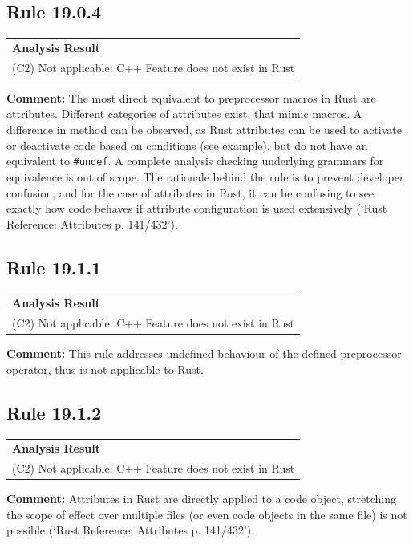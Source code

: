\subsection*{Rule 19.0.4}
\begin{longtable}{p{13cm}}
\textbf{Analysis Result} \\
(C2) Not applicable: C++ Feature does not exist in Rust \\
\end{longtable}
\textbf{Comment:} The most direct equivalent to preprocessor macros in Rust are attributes. Different categories of attributes exist, that mimic \Cpp macros. A difference in method can be observed, as Rust attributes can be used to activate or deactivate code based on conditions (see example), but do not have an equivalent to \texttt{\#undef}. A complete analysis checking underlying grammars for equivalence is out of scope. The rationale behind the rule is to prevent developer confusion, and for the case of attributes in Rust, it can be confusing to see exactly how code behaves if attribute configuration is used extensively (`Rust Reference: Attributes p. 141/432'). \\
\subsection*{Rule 19.1.1}
\begin{longtable}{p{13cm}}
\textbf{Analysis Result} \\
(C2) Not applicable: C++ Feature does not exist in Rust \\
\end{longtable}
\textbf{Comment:} This rule addresses undefined behaviour of the defined preprocessor operator, thus is not applicable to Rust. \\
\subsection*{Rule 19.1.2}
\begin{longtable}{p{13cm}}
\textbf{Analysis Result} \\
(C2) Not applicable: C++ Feature does not exist in Rust \\
\end{longtable}
\textbf{Comment:} Attributes in Rust are directly applied to a code object, stretching the scope of effect over multiple files (or even code objects in the same file) is not possible (`Rust Reference: Attributes p. 141/432'). \\

